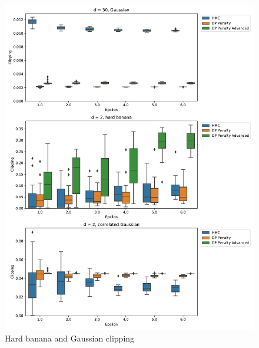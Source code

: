 ﻿\documentclass[a4paper]{article}
\begin{document}
\begin{figure}[h]
  \centering
  \includegraphics[width=\textwidth]{figures/banana_extra_clipping}
  \caption{Hard banana and Gaussian clipping}
  \label{banana_extra_clipping_fig}
\end{figure}
\end{document}
